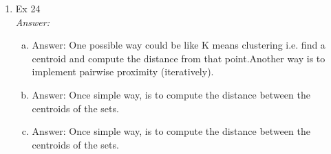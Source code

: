 \documentclass{article}
\begin{document}
\begin{enumerate}
\begin{enumerate}
\begin{table}[h]
\begin{tabular}{l cccc}
						\hline
					\end{tabular}	
				\end{table}	

			\item Ex 24\\
			\emph{Answer:}
			\begin{enumerate}[(a)]
				\item 
				Answer: One possible way could be like K means clustering i.e. find a centroid and compute the distance from that point.Another way
				is to implement pairwise proximity (iteratively).
				
				\item 
				Answer: Once simple way, is to compute the distance between the centroids of the sets.
				
				\item 
				Answer: Once simple way, is to compute the distance between the centroids of the sets.
			\end{enumerate}

		\end{enumerate}
		
\end{enumerate}
\end{document}
